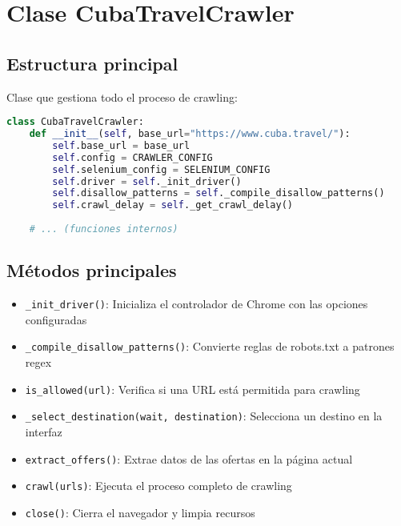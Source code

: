 \documentclass[a4paper,11pt]{article}
\begin{document}
\section{Clase CubaTravelCrawler}
\subsection{Estructura principal}
Clase que gestiona todo el proceso de crawling:

\begin{lstlisting}[language=Python, caption=Clase principal del crawler]
class CubaTravelCrawler:
    def __init__(self, base_url="https://www.cuba.travel/"):
        self.base_url = base_url
        self.config = CRAWLER_CONFIG
        self.selenium_config = SELENIUM_CONFIG
        self.driver = self._init_driver()
        self.disallow_patterns = self._compile_disallow_patterns()
        self.crawl_delay = self._get_crawl_delay()
    
    # ... (funciones internos)
\end{lstlisting}

\subsection{Métodos principales}
\begin{itemize}
    \item \texttt{\_init\_driver()}: Inicializa el controlador de Chrome con las opciones configuradas
    \item \texttt{\_compile\_disallow\_patterns()}: Convierte reglas de robots.txt a patrones regex
    \item \texttt{is\_allowed(url)}: Verifica si una URL está permitida para crawling
    \item \texttt{\_select\_destination(wait, destination)}: Selecciona un destino en la interfaz
    \item \texttt{extract\_offers()}: Extrae datos de las ofertas en la página actual
    \item \texttt{crawl(urls)}: Ejecuta el proceso completo de crawling
    \item \texttt{close()}: Cierra el navegador y limpia recursos
\end{itemize}
\end{document}
